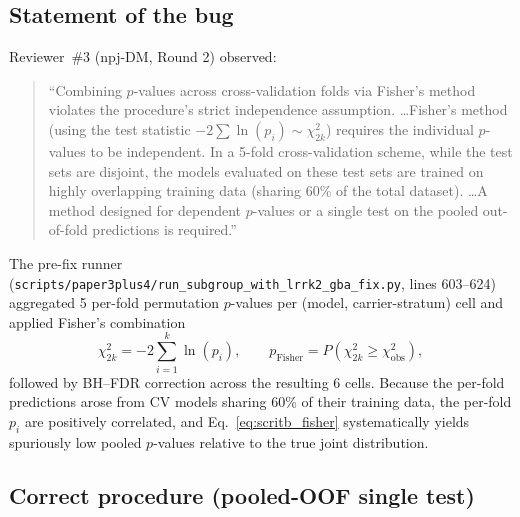 \documentclass[11pt]{article}
\begin{document}
\subsection*{Statement of the bug}

Reviewer~\#3 (npj-DM, Round 2) observed:

\begin{quote}
``Combining $p$-values across cross-validation folds via Fisher's method violates the procedure's strict independence assumption. \ldots Fisher's method (using the test statistic $-2\sum\ln(p_i)\sim\chi^2_{2k}$) requires the individual $p$-values to be independent. In a 5-fold cross-validation scheme, while the test sets are disjoint, the models evaluated on these test sets are trained on highly overlapping training data (sharing 60\% of the total dataset). \ldots A method designed for dependent $p$-values or a single test on the pooled out-of-fold predictions is required.''
\end{quote}

The pre-fix runner (\texttt{scripts/paper3plus4/run\_subgroup\_with\_lrrk2\_gba\_fix.py}, lines 603--624) aggregated 5 per-fold permutation $p$-values per (model, carrier-stratum) cell and applied Fisher's combination
\begin{equation}
\chi^2_{2k} = -2\sum_{i=1}^{k} \ln(p_i),\qquad p_\mathrm{Fisher} = P(\chi^2_{2k} \ge \chi^2_\mathrm{obs}),
\label{eq:scritb_fisher}
\end{equation}
followed by BH--FDR correction across the resulting 6 cells. Because the per-fold predictions arose from CV models sharing 60\% of their training data, the per-fold $p_i$ are positively correlated, and Eq.~\ref{eq:scritb_fisher} systematically yields spuriously low pooled $p$-values relative to the true joint distribution.

\subsection*{Correct procedure (pooled-OOF single test)}
\end{document}
